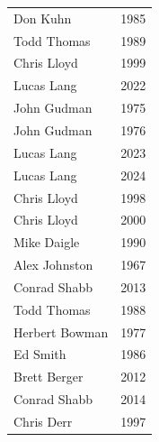 \begin{table}[H]
\begin{minipage}[t]{0.48\textwidth}
\begin{tabular}{@{}p{2.8cm}p{1.2cm}@{}}
    Don Kuhn & 1985 \\
    Todd Thomas & 1989 \\
    Chris Lloyd & 1999 \\
    Lucas Lang & 2022 \\
    John Gudman & 1975 \\
    John Gudman & 1976 \\
    Lucas Lang & 2023 \\
    Lucas Lang & 2024 \\
    Chris Lloyd & 1998 \\
    Chris Lloyd & 2000 \\
    Mike Daigle & 1990 \\
    Alex Johnston & 1967 \\
    Conrad Shabb & 2013 \\
    Todd Thomas & 1988 \\
    Herbert Bowman & 1977 \\
    Ed Smith & 1986 \\
    Brett Berger & 2012 \\
    Conrad Shabb & 2014 \\
    Chris Derr & 1997 \\
\hline
\end{tabular}
\end{minipage}
\end{table}

